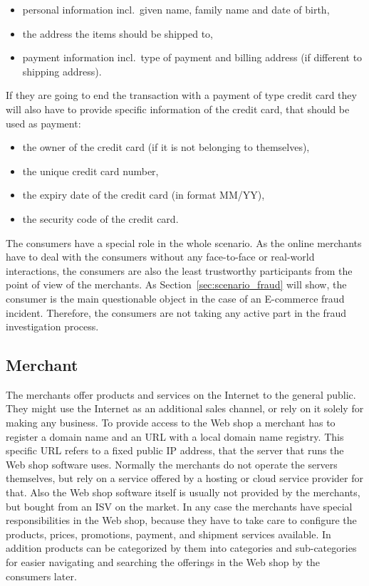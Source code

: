 \begin{itemize}
		\item personal information incl.\ given name, family name and date of birth,
		\item the address the items should be shipped to,
		\item payment information incl.\ type of payment and billing address (if different to shipping address).
\end{itemize}

If they are going to end the transaction with a payment of type credit card they will also have to provide specific information of the credit card, that should be used as payment:\@

\begin{itemize}
		\item the owner of the credit card (if it is not belonging to themselves),
		\item the unique credit card number,
		\item the expiry date of the credit card (in format MM/YY),
		\item the security code of the credit card.
\end{itemize}

The consumers have a special role in the whole scenario. As the online merchants have to deal with the consumers without any face-to-face or real-world interactions, the consumers are also the least trustworthy participants from the point of view of the merchants. As Section~\ref{sec:scenario_fraud} will show, the consumer is the main questionable object in the case of an \gls{E-commerce} fraud incident. Therefore, the consumers are not taking any active part in the fraud investigation process.


\subsection{Merchant}
\label{subsec:stakeholder_merchant}

The merchants offer products and services on the Internet to the general public. They might use the Internet as an additional sales channel, or rely on it solely for making any business. To provide access to the Web shop a merchant has to register a domain name and an \gls{URL} with a local domain name registry. This specific \gls{URL} refers to a fixed public \gls{IP} address, that the server that runs the Web shop software uses. Normally the merchants do not operate the servers themselves, but rely on a service offered by a hosting or cloud service provider for that. Also the Web shop software itself is usually not provided by the merchants, but bought from an \gls{ISV} on the market. In any case the merchants have special responsibilities in the Web shop, because they have to take care to configure the products, prices, promotions, payment, and shipment services available. In addition products can be categorized by them into categories and sub-categories for easier navigating and searching the offerings in the Web shop by the consumers later. \\

